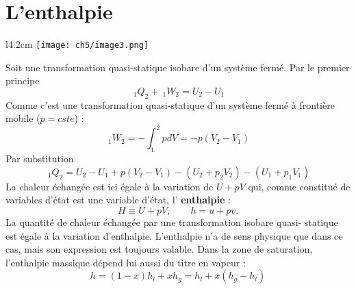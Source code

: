 \section{L'enthalpie}
\begin{wrapfigure}[9]{l}{4.2cm}
	\vspace{-7mm}
	\texttt{[image: ch5/image3.png]}
\end{wrapfigure}
Soit une transformation quasi-statique isobare d'un système fermé. Par 
le premier principe
\begin{equation}
\ _1Q_2 + \ _1W_2 = U_2-U_1
\end{equation}
Comme c'est une transformation quasi-statique d'un système fermé à 
frontière mobile ($p=cste$) :
\begin{equation}
\ _1W_2 = -\int_1^2 pdV = -p(V_2-V_1)
\end{equation}
Par substitution
\begin{equation}
\ _1Q_2 = U_2-U_1 + p(V_2-V_1) - (U_2+p_2V_2)-(U_1+p_1V_1)
\end{equation}
La chaleur échangée est ici égale à la variation de $U+pV$ qui, comme 
constitué de variables d'état est une variable d'état, l'\textbf{
enthalpie} :
\begin{equation}
H \equiv U + pV,\qquad h = u +pv.
\end{equation}
La quantité de chaleur échangée par une transformation isobare quasi-
statique est égale à la variation d'enthalpie. L'enthalpie n'a de 
sens physique que dans ce cas, mais son expression est toujours 
valable. Dans la zone de saturation, l'enthalpie massique dépend lui 
aussi du titre en vapeur :
\begin{equation}
h = (1-x)h_l + xh_g = h_l+x(h_g-h_l)
\end{equation}

